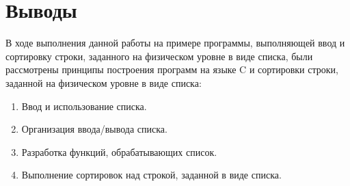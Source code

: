 \section{Выводы}

В ходе выполнения данной работы на примере программы, выполняющей
ввод и сортировку строки, заданного на физическом уровне в виде списка, были рассмотрены принципы
построения программ на языке C и сортировки строки, заданной на физическом уровне в виде списка:

\begin{enumerate}
    \item Ввод и использование списка.
    \item Организация ввода/вывода списка.
    \item Разработка функций, обрабатывающих список.
    \item Выполнение сортировок над
    строкой, заданной в виде списка.
\end{enumerate}